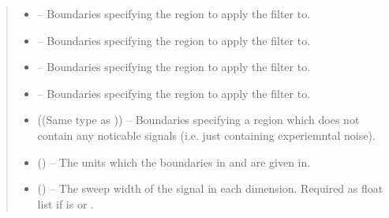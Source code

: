 \documentclass[letterpaper,10pt,english]{sphinxmanual}
\begin{document}
\begin{fulllineitems}
\begin{quote}
\begin{description}
\begin{itemize}
\item {} 
\sphinxAtStartPar
\sphinxstyleliteralstrong{\sphinxupquote{{[}}}\sphinxstyleliteralstrong{\sphinxupquote{{[}}} – Boundaries specifying the region to apply the filter to.

\item {} 
\sphinxAtStartPar
{}\sphinxstyleliteralstrong{\sphinxupquote{{]}}} – Boundaries specifying the region to apply the filter to.

\item {} 
\sphinxAtStartPar
\sphinxstyleliteralstrong{\sphinxupquote{{[}}} – Boundaries specifying the region to apply the filter to.

\item {} 
\sphinxAtStartPar
{}\sphinxstyleliteralstrong{\sphinxupquote{{]}}}\sphinxstyleliteralstrong{\sphinxupquote{{]}}} – Boundaries specifying the region to apply the filter to.

\item {} 
\sphinxAtStartPar
{} ((Same type as )) – Boundaries specifying a region which does not contain any noticable
signals (i.e. just containing experiemntal noise).

\item {} 
\sphinxAtStartPar
{} (\sphinxstyleliteralemphasis{\sphinxupquote{, }}\sphinxstyleliteralemphasis{\sphinxupquote{, }}) – The units which the boundaries in  and  are
given in.

\item {} 
\sphinxAtStartPar
{} (\sphinxstyleliteralemphasis{\sphinxupquote{{[}}}\sphinxstyleliteralemphasis{\sphinxupquote{{]}}}\sphinxstyleliteralemphasis{\sphinxupquote{, }}\sphinxstyleliteralemphasis{\sphinxupquote{{[}}}\sphinxstyleliteralemphasis{\sphinxupquote{, }}\sphinxstyleliteralemphasis{\sphinxupquote{{]} or }}\sphinxstyleliteralemphasis{\sphinxupquote{, }}) – The sweep width of the signal in each dimension. Required as float
list if  is  or .


\end{itemize}
\end{description}
\end{quote}
\end{fulllineitems}
\end{document}
